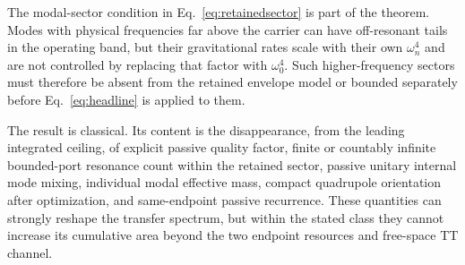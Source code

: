 The modal-sector condition in Eq.~\eqref{eq:retainedsector} is part of the theorem. Modes with physical frequencies far above the carrier can have off-resonant tails in the operating band, but their gravitational rates scale with their own $\omega_n^4$ and are not controlled by replacing that factor with $\omega_0^4$. Such higher-frequency sectors must therefore be absent from the retained envelope model or bounded separately before Eq.~\eqref{eq:headline} is applied to them.

The result is classical. Its content is the disappearance, from the leading integrated ceiling, of explicit passive quality factor, finite or countably infinite bounded-port resonance count within the retained sector, passive unitary internal mode mixing, individual modal effective mass, compact quadrupole orientation after optimization, and same-endpoint passive recurrence. These quantities can strongly reshape the transfer spectrum, but within the stated class they cannot increase its cumulative area beyond the two endpoint resources and free-space TT channel.
